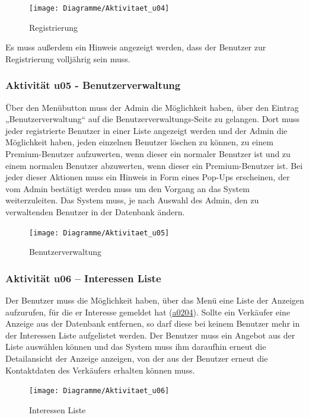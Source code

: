\documentclass[a4paper,12pt,oneside]{scrartcl}
\begin{document}
\begin{figure}[!htbp]
\centering
\noindent\texttt{[image: Diagramme/Aktivitaet\_u04]}
\caption{Registrierung}
\end{figure}
\FloatBarrier
Es muss außerdem ein Hinweis angezeigt werden, dass der Benutzer zur Registrierung volljährig sein muss.



\subsubsection{Aktivität u05 - Benutzerverwaltung}
Über den Menübutton muss der Admin die Möglichkeit haben, über den Eintrag „Benutzerverwaltung“ auf die Benutzerverwaltungs-Seite zu gelangen. 
Dort muss jeder registrierte Benutzer in einer Liste angezeigt werden und der Admin die Möglichkeit haben, jeden einzelnen Benutzer löschen zu können, zu einem Premium-Benutzer aufzuwerten, wenn dieser ein normaler Benutzer ist und zu einem normalen Benutzer abzuwerten, wenn dieser ein Premium-Benutzer ist. 
Bei jeder dieser Aktionen muss ein Hinweis in Form eines Pop-Ups erscheinen, der vom Admin bestätigt werden muss um den Vorgang an das System weiterzuleiten. 
Das System muss, je nach Auswahl des Admin, den zu verwaltenden Benutzer in der Datenbank ändern.

\begin{figure}[!htbp]
\centering
\noindent\texttt{[image: Diagramme/Aktivitaet\_u05]}
\caption{Benutzerverwaltung}
\end{figure}
\FloatBarrier


\subsubsection{Aktivität u06 – Interessen Liste}
Der Benutzer muss die Möglichkeit haben, über das Menü eine Liste der Anzeigen aufzurufen, für die er Interesse gemeldet hat (\hyperlink{u02}{a0204}).
Sollte ein Verkäufer eine Anzeige aus der Datenbank entfernen, so darf diese bei keinem Benutzer mehr in der Interessen Liste aufgelistet werden.
Der Benutzer muss ein Angebot aus der Liste auswählen können und das System muss ihm daraufhin erneut die Detailansicht der Anzeige anzeigen, von der aus der Benutzer erneut die Kontaktdaten des Verkäufers erhalten können muss.

\begin{figure}[!htbp]
\centering
\noindent\texttt{[image: Diagramme/Aktivitaet\_u06]}
\caption{Interessen Liste}
\end{figure}
\FloatBarrier
\end{document}
